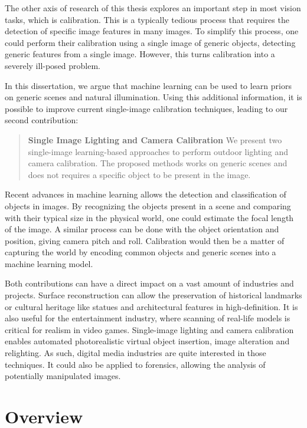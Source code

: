 The other axis of research of this thesis explores an important step in most vision tasks, which is calibration. This is a typically tedious process that requires the detection of specific image features in many images. To simplify this process, one could perform their calibration using a single image of generic objects, detecting generic features from a single image. However, this turns calibration into a severely ill-posed problem.

In this dissertation, we argue that machine learning can be used to learn priors on generic scenes and natural illumination. Using this additional information, it is possible to improve current single-image calibration techniques, leading to our second contribution:
\begin{quotation}
\textbf{Single Image Lighting and Camera Calibration} We present two single-image learning-based approaches to perform outdoor lighting and camera calibration. The proposed methods works on generic scenes and does not requires a specific object to be present in the image.
\end{quotation}

Recent advances in machine learning allows the detection and classification of objects in images. By recognizing the objects present in a scene and comparing with their typical size in the physical world, one could estimate the focal length of the image. A similar process can be done with the object orientation and position, giving camera pitch and roll. Calibration would then be a matter of capturing the world by encoding common objects and generic scenes into a machine learning model.

Both contributions can have a direct impact on a vast amount of industries and projects. Surface reconstruction can allow the preservation of historical landmarks or cultural heritage like statues and architectural features in high-definition. It is also useful for the entertainment industry, where scanning of real-life models is critical for realism in video games. Single-image lighting and camera calibration enables automated photorealistic virtual object insertion, image alteration and relighting. As such, digital media industries are quite interested in those techniques. It could also be applied to forensics, allowing the analysis of potentially manipulated images.

\section*{Overview}

